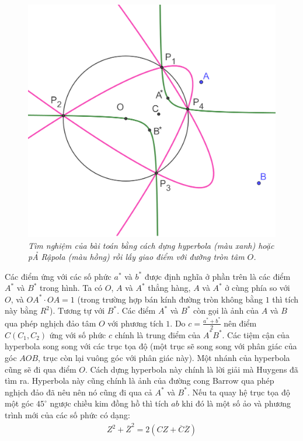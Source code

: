 \begin{multicols}{2}
\begin{figure}[H]
		\includegraphics[width= 1\linewidth]{15}
		\caption{\small\textit{\color{lichsutoanhoc}Tìm nghiệm của bài toán bằng cách dựng hyperbola (màu xanh) hoặc pẢ Rậpola (màu hồng) rồi lấy giao điểm với đường tròn tâm $O$.}}
		\vspace*{-10pt}
	\end{figure}
	Các điểm ứng với các số phức $a^*$ và $b^*$ được định nghĩa ở phần trên là các điểm $A^*$ và $B^*$ trong hình. Ta có $O$, $A$ và $A^*$ thẳng hàng, $A$ và $A^*$ ở cùng phía so với $O$, và $OA^*\!\cdot\! OA\!=\!1$ (trong trường hợp bán kính đường tròn không bằng $1$ thì tích này bằng $R^2$). Tương tự với $B^*$. Các điểm $A^*$ và $B^*$ còn gọi là ảnh của $A$ và $B$ qua phép nghịch đảo tâm $O$ với phương tích $1$. Do $c=\frac{a^* + b^*}{2}$ nên điểm $C(C_1,C_2)$ ứng với số phức $c$ chính là trung điểm của $A^*B^*$. Các tiệm cận của hyperbola song song với các trục tọa độ (một trục sẽ song song với phân giác của góc $AOB$, trục còn lại vuông góc với phân giác này). Một nhánh của hyperbola cũng sẽ đi qua điểm $O$. Cách dựng hyperbola này chính là lời giải mà Huygens đã tìm ra. Hyperbola này cũng chính là ảnh của đường cong Barrow qua phép nghịch đảo đã nêu nên nó cũng đi qua cả $A^*$ và $B^*$.
	\vskip 0.1cm
	Nếu ta quay hệ trục tọa độ một góc $45^\circ$ ngược chiều kim đồng hồ thì tích $ab$ khi đó là một số ảo và phương trình mới của các số phức có dạng:
	\begin{align*}
		Z^2 + \overline{Z}^2 = 2(CZ + \overline{C}\overline{Z})

\end{align*}
\end{multicols}
